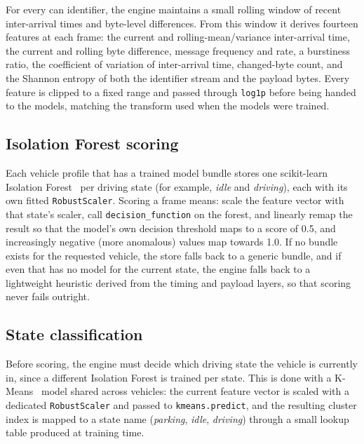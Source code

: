 For every \gls{can} identifier, the engine maintains a small rolling window of recent inter-arrival times and byte-level differences. From this window it derives fourteen features at each frame: the current and rolling-mean/variance inter-arrival time, the current and rolling byte difference, message frequency and rate, a burstiness ratio, the coefficient of variation of inter-arrival time, changed-byte count, and the Shannon entropy of both the identifier stream and the payload bytes. Every feature is clipped to a fixed range and passed through \texttt{log1p} before being handed to the models, matching the transform used when the models were trained.

\subsection{Isolation Forest scoring}

Each vehicle profile that has a trained model bundle stores one scikit-learn~\cite{pedregosa2011scikit} Isolation Forest~\cite{liu2008isolation} per driving state (for example, \emph{idle} and \emph{driving}), each with its own fitted \texttt{RobustScaler}. Scoring a frame means: scale the feature vector with that state's scaler, call \texttt{decision\_function} on the forest, and linearly remap the result so that the model's own decision threshold maps to a score of 0.5, and increasingly negative (more anomalous) values map towards 1.0. If no bundle exists for the requested vehicle, the store falls back to a generic bundle, and if even that has no model for the current state, the engine falls back to a lightweight heuristic derived from the timing and payload layers, so that scoring never fails outright.

\subsection{State classification}
\label{sec:impl-state}

Before scoring, the engine must decide which driving state the vehicle is currently in, since a different Isolation Forest is trained per state. This is done with a K-Means~\cite{macqueen1967methods} model shared across vehicles: the current feature vector is scaled with a dedicated \texttt{RobustScaler} and passed to \texttt{kmeans.predict}, and the resulting cluster index is mapped to a state name (\emph{parking}, \emph{idle}, \emph{driving}) through a small lookup table produced at training time.

